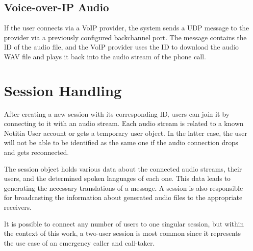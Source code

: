 \subsection{Voice-over-IP Audio}

If the user connects via a VoIP provider, the system sends a UDP message to the provider via a previously configured 
backchannel port. The message contains the ID of the audio file, and the VoIP provider uses the ID to download the 
audio WAV file and plays it back into the audio stream of the phone call.


\section{Session Handling}

After creating a new session with its corresponding ID, users can join it by connecting to it with an audio stream. 
Each audio stream is related to a known Notitia User account or gets a temporary user object. In the latter case, the 
user will not be able to be identified as the same one if the audio connection drops and gets reconnected.

The session object holds various data about the connected audio streams, their users, and the determined spoken 
languages of each one.
This data leads to generating the necessary translations of a message.
A session is also responsible for broadcasting the information about generated audio files to the appropriate receivers.

It is possible to connect any number of users to one singular session, but within the context of this work, a two-user 
session is most common since it represents the use case of an emergency caller and call-taker.
